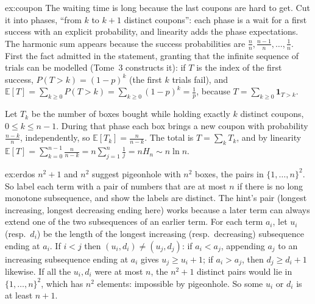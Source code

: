 \begin{solution}{ex:coupon}
\idea The waiting time is long because the last coupons are hard to get. Cut it into phases, ``from $k$ to $k+1$ distinct coupons'': each phase is a wait for a first success with an explicit probability, and linearity adds the phase expectations. The harmonic sum appears because the success probabilities are $\frac nn,\frac{n-1}n,\dots,\frac1n$.
\writeup First the fact admitted in the statement, granting that the infinite sequence of trials can be modelled (Tome~3 constructs it): if $T$ is the index of the first success, $P(T>k)=(1-p)^k$ (the first $k$ trials fail), and $\mathbb E[T]=\sum_{k\ge0}P(T>k)=\sum_{k\ge0}(1-p)^k=\frac1p$, because $T=\sum_{k\ge0}\mathbf 1_{T>k}$.

Let $T_k$ be the number of boxes bought while holding exactly $k$ distinct coupons, $0\le k\le n-1$. During that phase each box brings a new coupon with probability $\frac{n-k}n$,
independently, so $\mathbb E[T_k]=\frac n{n-k}$. The total is $T=\sum_kT_k$, and by linearity
$\mathbb E[T]=\sum_{k=0}^{n-1}\frac n{n-k}=n\sum_{j=1}^n\frac1j=nH_n\sim n\ln n$.
\end{solution}

\begin{solution}{ex:erdos}
\idea $n^2+1$ and $n^2$ suggest pigeonhole with $n^2$ boxes, the pairs in $\{1,\dots,n\}^2$. So label each term with a pair of numbers that are at most $n$ if there is no long monotone subsequence, and show the labels are distinct. The hint's pair (longest increasing, longest decreasing ending here) works because a later term can always extend one of the two subsequences of an earlier term.
\writeup For each term $a_i$, let $u_i$ (resp.\ $d_i$) be the length of the longest increasing (resp.\ decreasing) subsequence ending at $a_i$. If $i<j$ then $(u_i,d_i)\ne(u_j,d_j)$:
if $a_i<a_j$, appending $a_j$ to an increasing subsequence ending at $a_i$ gives $u_j\ge u_i+1$; if $a_i>a_j$, then $d_j\ge d_i+1$ likewise. If all the $u_i,d_i$ were at most $n$, the $n^2+1$ distinct pairs would lie in
$\{1,\dots,n\}^2$, which has $n^2$ elements: impossible by pigeonhole. So some $u_i$ or $d_i$ is at least $n+1$.
\end{solution}



